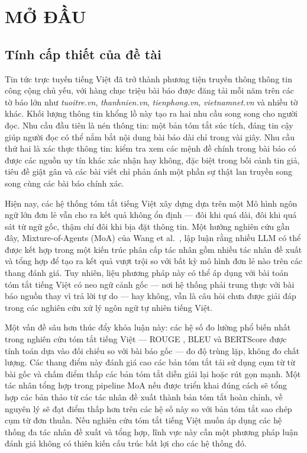 \chapter*{MỞ ĐẦU}

\section*{Tính cấp thiết của đề tài}

Tin tức trực tuyến tiếng Việt đã trở thành phương tiện truyền thông thông tin công cộng
chủ yếu, với hàng chục triệu bài báo được đăng tải mỗi năm trên các tờ báo lớn như
\textit{tuoitre.vn}, \textit{thanhnien.vn}, \textit{tienphong.vn},
\textit{vietnamnet.vn} và nhiều tờ khác. Khối lượng thông tin khổng lồ này tạo ra hai
nhu cầu song song cho người đọc. Nhu cầu đầu tiên là nén thông tin: một bản tóm
tắt súc tích, đáng tin cậy giúp người đọc có thể nắm bắt nội dung bài báo dài chỉ trong
vài giây. Nhu cầu thứ hai là xác thực thông tin: kiểm tra xem các mệnh đề chính
trong bài báo có được các nguồn uy tín khác xác nhận hay không, đặc biệt trong bối cảnh
tin giả, tiêu đề giật gân và các bài viết chỉ phản ánh một phần sự thật lan truyền song
song cùng các bài báo chính xác.

Hiện nay, các hệ thống tóm tắt tiếng Việt xây dựng dựa trên một Mô hình ngôn ngữ lớn đơn lẻ vẫn cho ra kết quả không ổn định --- đôi khi quá dài, đôi khi quá sát từ
ngữ gốc, thậm chí đôi khi bịa đặt thông tin. Một hướng nghiên cứu gần đây,
Mixture-of-Agents (MoA) của Wang et al.\ \cite{Wang2024}, lập luận rằng
nhiều LLM có thể được kết hợp trong một kiến trúc phân cấp tác nhân gồm nhiều tác nhân đề xuất và tổng hợp
để tạo ra kết quả vượt trội so với bất kỳ mô hình đơn lẻ nào trên các thang đánh giá.
Tuy nhiên, liệu phương pháp này có thể áp dụng với bài toán tóm tắt tiếng Việt
có neo ngữ cảnh gốc --- nơi hệ thống phải trung thực với bài báo nguồn thay
vì trả lời tự do --- hay không, vẫn là câu hỏi chưa được giải đáp trong các nghiên
cứu xử lý ngôn ngữ tự nhiên tiếng Việt.

Một vấn đề sâu hơn thúc đẩy khóa luận này: các hệ số đo lường phổ biến nhất trong
nghiên cứu tóm tắt tiếng Việt --- ROUGE \cite{Lin2004}, BLEU \cite{papineni2002bleu} và BERTScore
\cite{Zhang2020} được tính toán dựa vào đối chiếu so với bài báo gốc --- đo độ trùng lặp, không đo chất lượng.
Các thang điểm này đánh giá cao các bản tóm tắt tái sử dụng cụm từ từ bài gốc và chấm điểm thấp các bản tóm tắt
diễn giải lại hoặc rút gọn mạnh. Một tác nhân tổng hợp trong pipeline MoA nếu được triển
khai đúng cách sẽ tổng
hợp các bản thảo từ các tác nhân đề xuất thành bản tóm tắt hoàn chỉnh, về nguyên lý sẽ đạt điểm thấp
hơn trên các hệ số này so với bản tóm tắt sao chép cụm từ đơn thuần. Nếu nghiên cứu tóm
tắt tiếng Việt muốn áp dụng các hệ thống đa tác nhân đề xuất và tổng hợp, lĩnh vực này cần
một phương pháp luận đánh giá không có thiên kiến cấu trúc bất lợi cho các hệ thống đó.

